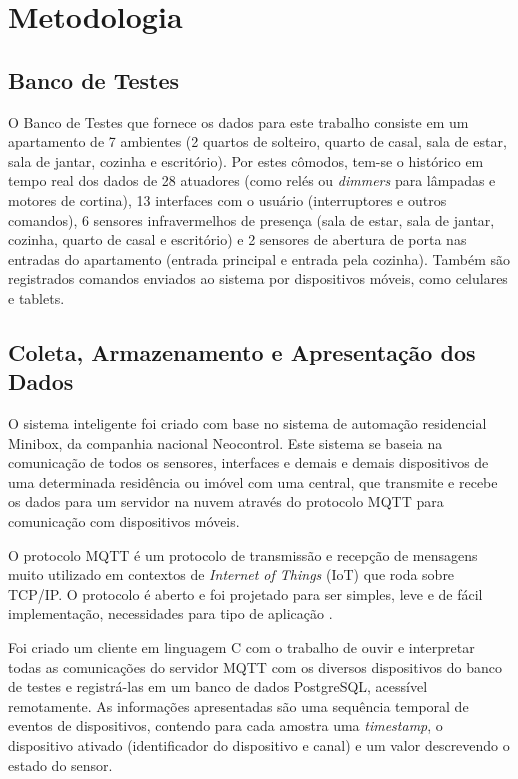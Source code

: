 \documentclass[
	12pt,				%
	openright,			%
	twoside,			%
	a4paper,			%
	english,			%
	spanish,			%
	brazil,				%
	]{abntex2}\usepackage[]{graphicx}\usepackage[]{color}
\begin{document}
\chapter{Metodologia}

\section{Banco de Testes}

O Banco de Testes que fornece os dados para este trabalho consiste em um apartamento de 7 ambientes (2 quartos de solteiro, quarto de casal, sala de estar, sala de jantar, cozinha e escritório). Por estes cômodos, tem-se o histórico em tempo real dos dados de 28 atuadores (como relés ou \textit{dimmers} para lâmpadas e motores de cortina), 13 interfaces com o usuário (interruptores e outros comandos), 6 sensores infravermelhos de presença (sala de estar, sala de jantar, cozinha, quarto de casal e escritório) e 2 sensores de abertura de porta nas entradas do apartamento (entrada principal e entrada pela cozinha). Também são registrados comandos enviados ao sistema por dispositivos móveis, como celulares e tablets.


\section{Coleta, Armazenamento e Apresentação dos Dados}

O sistema inteligente foi criado com base no sistema de automação residencial Minibox, da companhia nacional Neocontrol. Este sistema se baseia na comunicação de todos os sensores, interfaces e demais e demais dispositivos de uma determinada residência ou imóvel com uma central, que transmite e recebe os dados para um servidor na nuvem através do protocolo MQTT para comunicação com dispositivos móveis.

O protocolo MQTT é um protocolo de transmissão e recepção de mensagens muito utilizado em contextos de \textit{Internet of Things} (IoT) que roda sobre TCP/IP. O protocolo é aberto e foi projetado para ser simples, leve e de fácil implementação, necessidades para tipo de aplicação \cite{OASIS2014}.

Foi criado um cliente em linguagem C com o trabalho de ouvir e interpretar todas as comunicações do servidor MQTT com os diversos dispositivos do banco de testes e registrá-las em um banco de dados PostgreSQL, acessível remotamente.
As informações apresentadas são uma sequência temporal de eventos de dispositivos, contendo para cada amostra uma \textit{timestamp}, o dispositivo ativado (identificador do dispositivo e canal) e um valor descrevendo o estado do sensor. 
\end{document}
